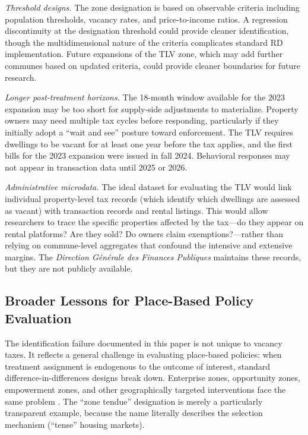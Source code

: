 \documentclass[12pt]{article}
\begin{document}
\textit{Threshold designs.} The zone designation is based on observable criteria including population thresholds, vacancy rates, and price-to-income ratios. A regression discontinuity at the designation threshold could provide cleaner identification, though the multidimensional nature of the criteria complicates standard RD implementation. Future expansions of the TLV zone, which may add further communes based on updated criteria, could provide cleaner boundaries for future research.

\textit{Longer post-treatment horizons.} The 18-month window available for the 2023 expansion may be too short for supply-side adjustments to materialize. Property owners may need multiple tax cycles before responding, particularly if they initially adopt a ``wait and see'' posture toward enforcement. The TLV requires dwellings to be vacant for at least one year before the tax applies, and the first bills for the 2023 expansion were issued in fall 2024. Behavioral responses may not appear in transaction data until 2025 or 2026.

\textit{Administrative microdata.} The ideal dataset for evaluating the TLV would link individual property-level tax records (which identify which dwellings are assessed as vacant) with transaction records and rental listings. This would allow researchers to trace the specific properties affected by the tax---do they appear on rental platforms? Are they sold? Do owners claim exemptions?---rather than relying on commune-level aggregates that confound the intensive and extensive margins. The \textit{Direction G\'en\'erale des Finances Publiques} maintains these records, but they are not publicly available.

\subsection{Broader Lessons for Place-Based Policy Evaluation}

The identification failure documented in this paper is not unique to vacancy taxes. It reflects a general challenge in evaluating place-based policies: when treatment assignment is endogenous to the outcome of interest, standard difference-in-differences designs break down. Enterprise zones, opportunity zones, empowerment zones, and other geographically targeted interventions face the same problem \citep{garicano2016firm}. The ``zone tendue'' designation is merely a particularly transparent example, because the name literally describes the selection mechanism (``tense'' housing markets).
\end{document}
